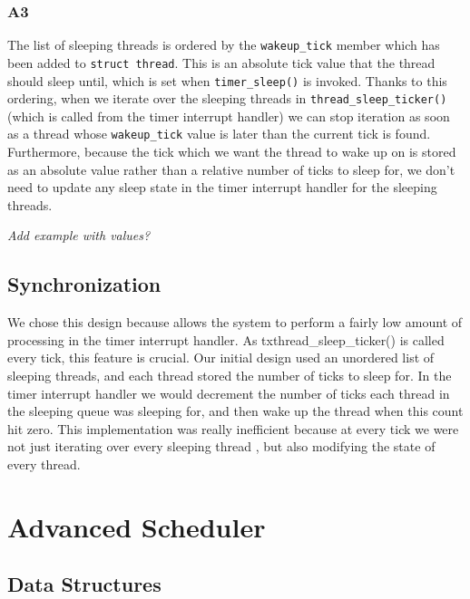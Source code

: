 \documentclass[a4wide, 11pt]{article}
\newcommand{\tx}{\texttt}
\begin{document}
\subsubsection{A3}

The list of sleeping threads is ordered by the \tx{wakeup\_tick} member
which has been added to \tx{struct thread}. This is an absolute tick value that the thread 
should sleep until, which is set when \tx{timer\_sleep()} is invoked. Thanks to this ordering, when we iterate over the sleeping threads in \tx{thread\_sleep\_ticker()} (which is called from the
timer interrupt handler) we can stop iteration as soon as a thread whose
\tx{wakeup\_tick} value is later than the current tick is found.
\\
Furthermore, because the tick which we want the thread to wake up on is stored as
an absolute value rather than a relative number of ticks to sleep for, we don't
need to update any sleep state in the timer interrupt handler for the sleeping
threads.

\emph{Add example with values?}

\subsection{Synchronization}

We chose this design because allows the system to perform a fairly low amount of processing in the
timer interrupt handler. As tx{thread\_sleep\_ticker()} is called every tick, this feature is crucial. Our
initial design used an unordered list of sleeping threads, and each thread
stored the number of ticks to sleep for. In the timer interrupt handler we
would decrement the number of ticks each thread in the sleeping queue was
sleeping for, and then wake up the thread when this count hit zero. This implementation was
really inefficient because at every tick we were not just iterating over every sleeping
thread , but also modifying the state of every thread.

\section{Advanced Scheduler}
\subsection{Data Structures}
\end{document}

